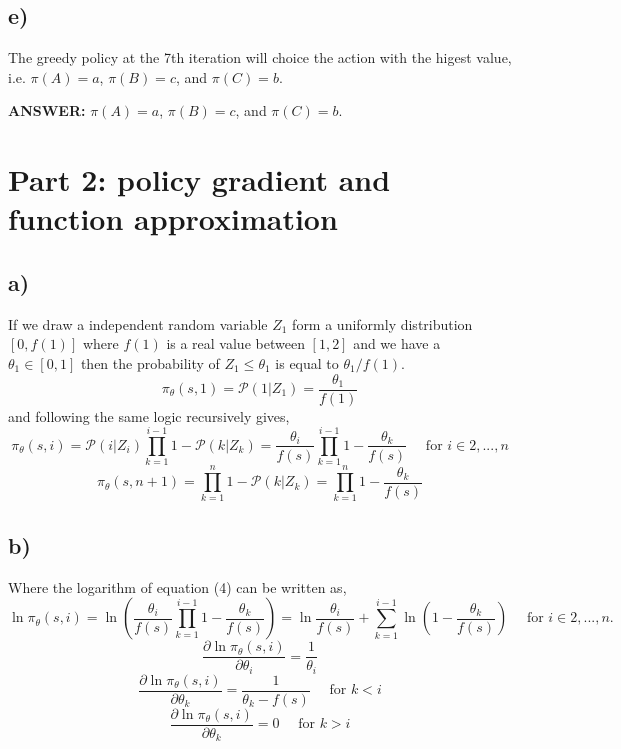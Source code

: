 \documentclass{article}
\begin{document}
\subsection*{e)}
The greedy policy at the 7th iteration will choice the action with the higest value, i.e. $\pi(A)=a$, $\pi(B)=c$, and $\pi(C)=b$.

\textbf{ANSWER:} $\pi(A)=a$, $\pi(B)=c$, and $\pi(C)=b$.

\newpage
\section*{Part 2: policy gradient and function approximation}
\subsection*{a)}
If we draw a independent random variable $Z_1$ form a uniformly distribution $[0,f(1)]$ where $f(1)$ is a real value between $[1,2]$ and we have a $\theta_1\in[0,1]$ then the probability of $Z_1 \leq \theta_1$ is equal to $\theta_1/f(1)$.
\begin{equation}
    \pi_{\theta}(s, 1)= \mathcal{P}(1|Z_1) = \frac{\theta_1 }{f(1)}
\end{equation}
and following the same logic recursively gives,
\begin{equation}
    \pi_{\theta}(s, i)=  \mathcal{P}(i|Z_i)\prod_{k=1}^{i-1}1-\mathcal{P}(k|Z_k) = \frac{\theta_i }{f(s)}\prod_{k=1}^{i-1}1-\frac{\theta_k }{f(s)} \quad \text{ for } i \in {2,...,n}
\end{equation}
\begin{equation}
    \pi_{\theta}(s, n+1)= \prod_{k=1}^{n}1-\mathcal{P}(k|Z_k) = \prod_{k=1}^{n}1-\frac{\theta_k }{f(s)} 
\end{equation}

\subsection*{b)}
Where the logarithm of equation (4) can be written as,
\begin{equation}
    \ln{\pi_{\theta}(s, i)}= \ln \left( \frac{\theta_i }{f(s)}\prod_{k=1}^{i-1}1-\frac{\theta_k }{f(s)} \right)=  \ln\frac{\theta_i }{f(s)} + \sum_{k=1}^{i-1} \ln \left(1-\frac{\theta_k }{f(s)}\right) \quad \text{ for } i \in {2,...,n}.
\end{equation}
\begin{equation}
    \frac{\partial \ln \pi_{\theta}(s, i)}{\partial \theta_{i}} = \frac{1}{\theta_i}
\end{equation}
\begin{equation}
    \frac{\partial \ln \pi_{\theta}(s, i)}{\partial \theta_{k}}= \frac{1}{\theta_k - f(s)}\quad \text { for } k<i
\end{equation}
\begin{equation}
    \frac{\partial \ln \pi_{\theta}(s, i)}{\partial \theta_{k}}=0 \quad \text { for } k>i 
\end{equation}
\end{document}
